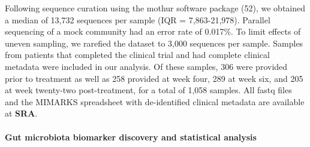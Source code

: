 \documentclass[12pt,]{article}
\let\oldparagraph\paragraph
\renewcommand{\paragraph}[1]{\oldparagraph{#1}\mbox{}}
\begin{document}
Following sequence curation using the mothur software package (52), we
obtained a median of 13,732 sequences per sample (IQR = 7,863-21,978).
Parallel sequencing of a mock community had an error rate of 0.017\%. To
limit effects of uneven sampling, we rarefied the dataset to 3,000
sequences per sample. Samples from patients that completed the clinical
trial and had complete clinical metadata were included in our analysis.
Of these samples, 306 were provided prior to treatment as well as 258
provided at week four, 289 at week six, and 205 at week twenty-two
post-treatment, for a total of 1,058 samples. All fastq files and the
MIMARKS spreadsheet with de-identified clinical metadata are available
at \textbf{SRA}.

\paragraph{Gut microbiota biomarker discovery and statistical
analysis}\label{gut-microbiota-biomarker-discovery-and-statistical-analysis}
\end{document}
